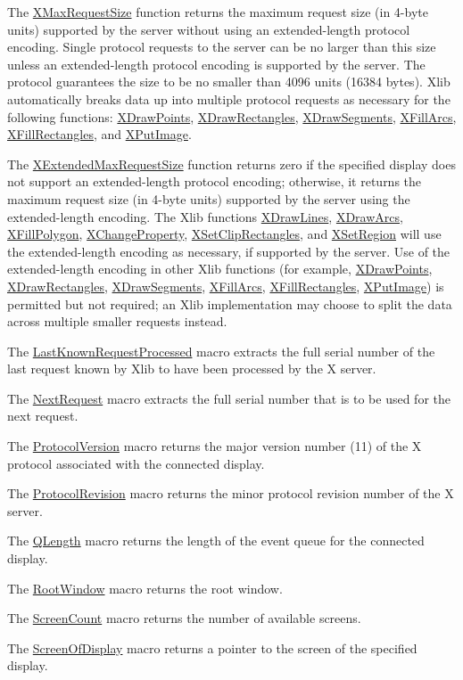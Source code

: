\documentclass[]{article}
\renewcommand{\emph}[1]{\underline{#1}}
\begin{document}
The \emph{XMaxRequestSize} function returns the maximum request size (in
4-byte units) supported by the server without using an extended-length
protocol encoding. Single protocol requests to the server can be no
larger than this size unless an extended-length protocol encoding is
supported by the server. The protocol guarantees the size to be no
smaller than 4096 units (16384 bytes). Xlib automatically breaks data up
into multiple protocol requests as necessary for the following
functions: \emph{XDrawPoints}, \emph{XDrawRectangles},
\emph{XDrawSegments}, \emph{XFillArcs}, \emph{XFillRectangles}, and
\emph{XPutImage}.

The \emph{XExtendedMaxRequestSize} function returns zero if the
specified display does not support an extended-length protocol encoding;
otherwise, it returns the maximum request size (in 4-byte units)
supported by the server using the extended-length encoding. The Xlib
functions \emph{XDrawLines}, \emph{XDrawArcs}, \emph{XFillPolygon},
\emph{XChangeProperty}, \emph{XSetClipRectangles}, and \emph{XSetRegion}
will use the extended-length encoding as necessary, if supported by the
server. Use of the extended-length encoding in other Xlib functions (for
example, \emph{XDrawPoints}, \emph{XDrawRectangles},
\emph{XDrawSegments}, \emph{XFillArcs}, \emph{XFillRectangles},
\emph{XPutImage}) is permitted but not required; an Xlib implementation
may choose to split the data across multiple smaller requests instead.

The \emph{LastKnownRequestProcessed} macro extracts the full serial
number of the last request known by Xlib to have been processed by the X
server.

The \emph{NextRequest} macro extracts the full serial number that is to
be used for the next request.

The \emph{ProtocolVersion} macro returns the major version number (11)
of the X protocol associated with the connected display.

The \emph{ProtocolRevision} macro returns the minor protocol revision
number of the X server.

The \emph{QLength} macro returns the length of the event queue for the
connected display.

The \emph{RootWindow} macro returns the root window.

The \emph{ScreenCount} macro returns the number of available screens.

The \emph{ScreenOfDisplay} macro returns a pointer to the screen of the
specified display.
\end{document}
